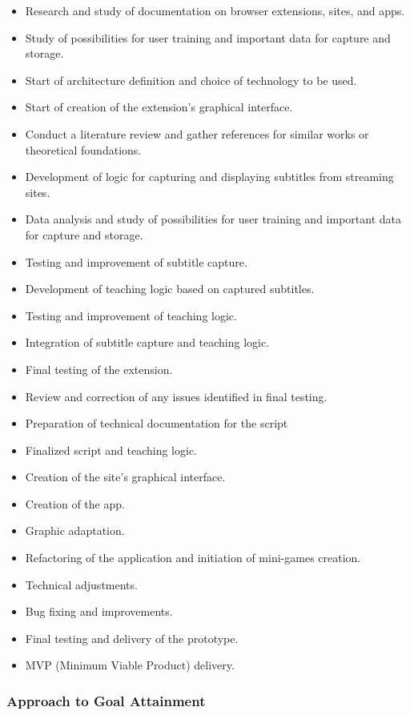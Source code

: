 \documentclass[12pt]{article}
\begin{document}
\begin{itemize}
\item Research and study of documentation on browser extensions, sites, and apps.
\item Study of possibilities for user training and important data for capture and storage.
\item Start of architecture definition and choice of technology to be used.
\item Start of creation of the extension's graphical interface.
\item Conduct a literature review and gather references for similar works or theoretical foundations.
\item Development of logic for capturing and displaying subtitles from streaming sites.
\item Data analysis and study of possibilities for user training and important data for capture and storage.
\item Testing and improvement of subtitle capture.
\item Development of teaching logic based on captured subtitles.
\item Testing and improvement of teaching logic.
\item Integration of subtitle capture and teaching logic.
\item Final testing of the extension.
\item Review and correction of any issues identified in final testing.
\item Preparation of technical documentation for the script 
\item Finalized script and teaching logic.
\item Creation of the site's graphical interface.
\item Creation of the app. 
\item Graphic adaptation.
\item Refactoring of the application and initiation of mini-games creation.
\item Technical adjustments.
\item Bug fixing and improvements.
\item Final testing and delivery of the prototype.
\item MVP (Minimum Viable Product) delivery.
\end {itemize}

\subsubsection{Approach to Goal Attainment}
\end{document}
